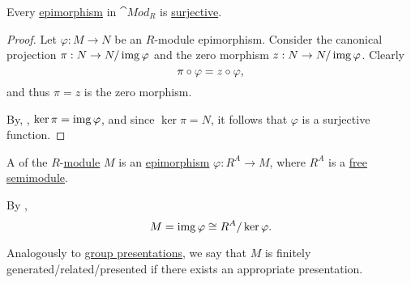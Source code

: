 \begin{proposition}\label{thm:module_epimorphisms_are_surjective}
  Every \hyperref[def:morphism_invertibility/right_cancellative]{epimorphism} in \hyperref[def:group/category]{\( \cat{Mod}_R \)} is \hyperref[def:function_invertibility/surjective]{surjective}.
\end{proposition}
\begin{proof}
  Let \( \varphi: M \to N \) be an \( R \)-module epimorphism. Consider the canonical projection \( \pi: N \to N / \operatorname{img} \varphi \) and the zero morphism \( z: N \to N / \operatorname{img} \varphi \). Clearly
  \begin{equation*}
    \pi \bincirc \varphi = z \bincirc \varphi,
  \end{equation*}
  and thus \( \pi = z \) is the zero morphism.

  By, , \( \ker \pi = \operatorname{img} \varphi \), and since \( \ker \pi = N \), it follows that \( \varphi \) is a surjective function.
\end{proof}

\begin{definition}\label{def:module_presentation}
  A  of the \( R \)-\hyperref[def:module]{module} \( M \) is an \hyperref[def:module/homomorphism]{epimorphism} \( \varphi: R^A \to M \), where \( R^A \) is a \hyperref[def:free_semimodule]{free semimodule}.

  By ,
  \begin{equation*}
    M = \operatorname{img} \varphi \cong R^A / \ker \varphi.
  \end{equation*}

  Analogously to \hyperref[def:group_presentation]{group presentations}, we say that \( M \) is finitely generated/related/presented if there exists an appropriate presentation.
\end{definition}

